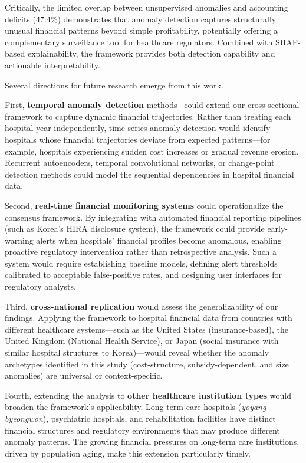 \documentclass{ieeeaccess}
\begin{document}
Critically, the limited overlap between unsupervised anomalies and accounting deficits (47.4\%) demonstrates that anomaly detection captures structurally unusual financial patterns beyond simple profitability, potentially offering a complementary surveillance tool for healthcare regulators. Combined with SHAP-based explainability, the framework provides both detection capability and actionable interpretability.

Several directions for future research emerge from this work.

First, \textbf{temporal anomaly detection} methods~\cite{schmidl2022anomaly} could extend our cross-sectional framework to capture dynamic financial trajectories. Rather than treating each hospital-year independently, time-series anomaly detection would identify hospitals whose financial trajectories deviate from expected patterns---for example, hospitals experiencing sudden cost increases or gradual revenue erosion. Recurrent autoencoders, temporal convolutional networks, or change-point detection methods could model the sequential dependencies in hospital financial data.

Second, \textbf{real-time financial monitoring systems} could operationalize the consensus framework. By integrating with automated financial reporting pipelines (such as Korea's HIRA disclosure system), the framework could provide early-warning alerts when hospitals' financial profiles become anomalous, enabling proactive regulatory intervention rather than retrospective analysis. Such a system would require establishing baseline models, defining alert thresholds calibrated to acceptable false-positive rates, and designing user interfaces for regulatory analysts.

Third, \textbf{cross-national replication} would assess the generalizability of our findings. Applying the framework to hospital financial data from countries with different healthcare systems---such as the United States (insurance-based), the United Kingdom (National Health Service), or Japan (social insurance with similar hospital structures to Korea)---would reveal whether the anomaly archetypes identified in this study (cost-structure, subsidy-dependent, and size anomalies) are universal or context-specific.

Fourth, extending the analysis to \textbf{other healthcare institution types} would broaden the framework's applicability. Long-term care hospitals (\textit{yoyang byeongwon}), psychiatric hospitals, and rehabilitation facilities have distinct financial structures and regulatory environments that may produce different anomaly patterns. The growing financial pressures on long-term care institutions, driven by population aging, make this extension particularly timely.
\end{document}
